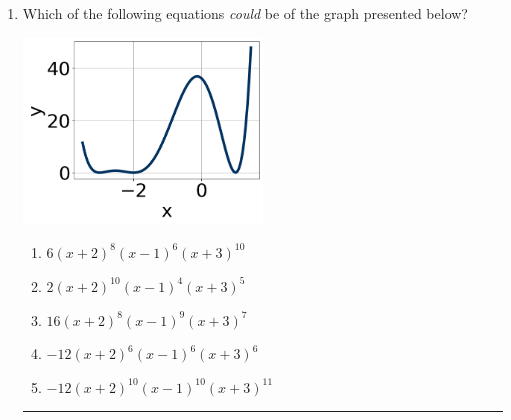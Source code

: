 \documentclass[14pt]{extbook}
\newcommand{\litem}[1]{\item#1\hspace*{-1cm}\rule{\textwidth}{0.4pt}}
\begin{document}
\begin{enumerate}
{\begin{enumerate}[label=\Alph*.]
\end{enumerate} }
\litem{
Which of the following equations \textit{could} be of the graph presented below?
\begin{center}
    \includegraphics[width=0.5\textwidth]{../Figures/polyGraphToFunctionC.png}
\end{center}
\begin{enumerate}[label=\Alph*.]
\item \( 6(x + 2)^{8} (x - 1)^{6} (x + 3)^{10} \)
\item \( 2(x + 2)^{10} (x - 1)^{4} (x + 3)^{5} \)
\item \( 16(x + 2)^{8} (x - 1)^{9} (x + 3)^{7} \)
\item \( -12(x + 2)^{6} (x - 1)^{6} (x + 3)^{6} \)
\item \( -12(x + 2)^{10} (x - 1)^{10} (x + 3)^{11} \)


\end{enumerate}}
\end{enumerate}
\end{document}
